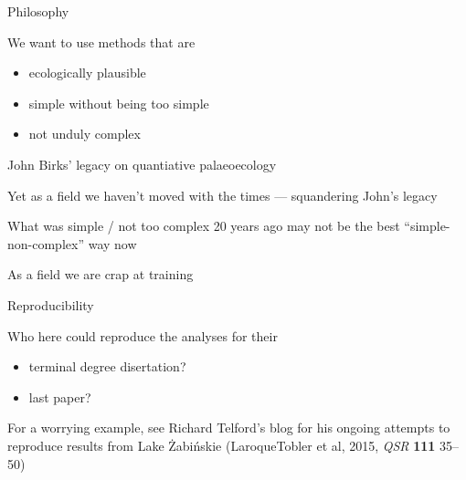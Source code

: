 \documentclass[10pt,ignorenonframetext,compress, aspectratio=169]{beamer}
\providecommand{\tightlist}{%
  \setlength{\itemsep}{0pt}\setlength{\parskip}{0pt}}
\newcommand{\columnsend}{\end{columns}}
\begin{document}

\begin{frame}{Philosophy}

We want to use methods that are

\begin{itemize}
\tightlist
\item
  ecologically plausible
\item
  simple without being too simple
\item
  not unduly complex
\end{itemize}

John Birks' legacy on quantiative palaeoecology

Yet as a field we haven't moved with the times --- squandering John's
legacy

What was simple / not too complex 20 years ago may not be the best
``simple-non-complex'' way now

As a field we are crap at training

\end{frame}

\begin{frame}{Reproducibility}

Who here could reproduce the analyses for their

\begin{itemize}
\tightlist
\item
  terminal degree disertation?
\item
  last paper?
\end{itemize}

For a worrying example, see Richard Telford's blog for his ongoing
attempts to reproduce results from Lake Żabińskie (LaroqueTobler et al,
2015, \emph{QSR} \textbf{111} 35--50)

\href{https://quantpalaeo.wordpress.com/tag/larocque-tobler-et-al-2015/}{}

\end{frame}
\end{document}
